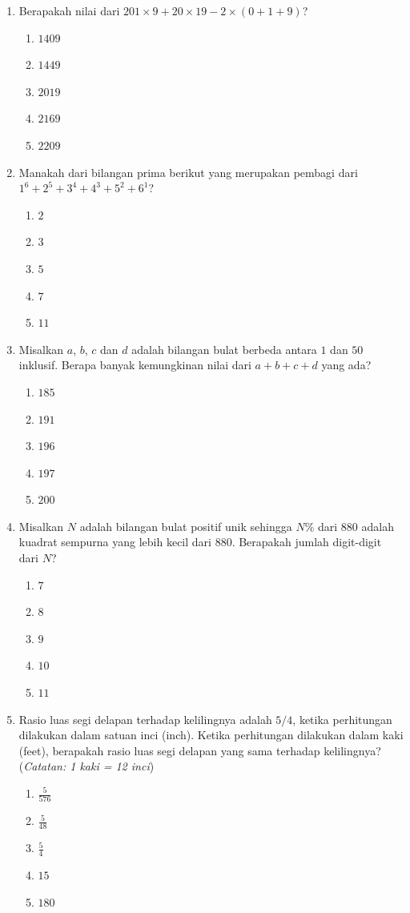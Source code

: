 \documentclass{article}
\begin{document}
\begin{enumerate}

\item Berapakah nilai dari $201\times9+20\times19-2\times(0+1+9)$?
\begin{enumerate}
    \item $1409$
    \item $1449$
    \item $2019$
    \item $2169$
    \item $2209$
\end{enumerate}

\item Manakah dari bilangan prima berikut yang merupakan pembagi dari $1^{6}+2^{5}+3^{4}+4^{3}+5^{2}+6^{1}$?
\begin{enumerate}
    \item $2$
    \item $3$
    \item $5$
    \item $7$
    \item $11$
\end{enumerate}

\item Misalkan $a$, $b$, $c$ dan $d$ adalah bilangan bulat berbeda antara $1$ dan $50$ inklusif. Berapa banyak kemungkinan nilai dari $a+b+c+d$ yang ada?
\begin{enumerate}
    \item $185$
    \item $191$
    \item $196$
    \item $197$
    \item $200$
\end{enumerate}

\item Misalkan $N$ adalah bilangan bulat positif unik sehingga $N$\% dari $880$ adalah kuadrat sempurna yang lebih kecil dari $880$. Berapakah jumlah digit-digit dari $N$?
\begin{enumerate}
    \item $7$
    \item $8$
    \item $9$
    \item $10$
    \item $11$
\end{enumerate}

\item Rasio luas segi delapan terhadap kelilingnya adalah $5/4$, ketika perhitungan dilakukan dalam satuan inci (inch). Ketika perhitungan dilakukan dalam kaki (feet), berapakah rasio luas segi delapan yang sama terhadap kelilingnya? (\textit{Catatan: 1 kaki = 12 inci})
\begin{enumerate}
    \item $\frac{5}{576}$
    \item $\frac{5}{48}$
    \item $\frac{5}{4}$
    \item $15$
    \item $180$
\end{enumerate}


\end{enumerate}
\end{document}

